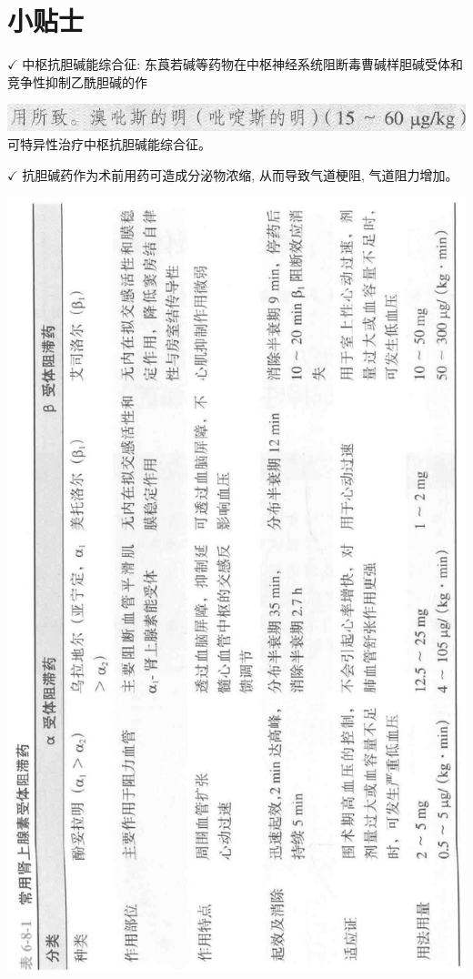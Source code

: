 \documentclass[10pt]{article}
\begin{document}
\section*{小贴士}
$\checkmark$ 中枢抗胆碱能综合征: 东莨若碱等药物在中枢神经系统阻断毒曹碱样胆碱受体和竞争性抑制乙酰胆碱的作

\includegraphics[max width=\textwidth, center]{2024_07_05_645bb794a4d4f32ee0c8g-343}\\
可特异性治疗中枢抗胆碱能综合征。

$\checkmark$ 抗胆碱药作为术前用药可造成分泌物浓缩, 从而导致气道梗阻, 气道阻力增加。

\begin{center}
\includegraphics[max width=\textwidth]{2024_07_05_645bb794a4d4f32ee0c8g-344}
\end{center}
\end{document}
